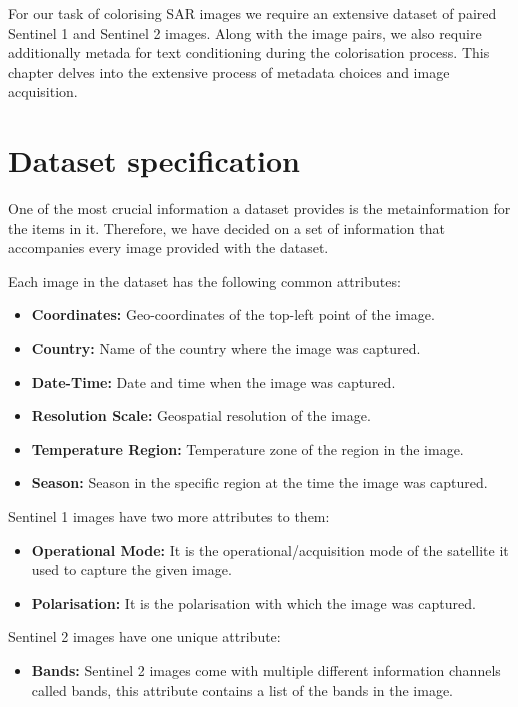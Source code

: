 For our task of colorising SAR images we require an extensive dataset of paired Sentinel 1 and Sentinel 2 images. Along with the image pairs, we also require additionally metada for text conditioning during the colorisation process. This chapter delves into the extensive process of metadata choices and image acquisition.

\section{Dataset specification}

One of the most crucial information a dataset provides is the metainformation for the items in it. Therefore, we have decided on a set of information that accompanies every image provided with the dataset.

Each image in the dataset has the following common attributes:
\begin{itemize}
    \item \textbf{Coordinates:} Geo-coordinates of the top-left point of the image.
    \item \textbf{Country:} Name of the country where the image was captured.
    \item \textbf{Date-Time:} Date and time when the image was captured.
    \item \textbf{Resolution Scale:} Geospatial resolution of the image.
    \item \textbf{Temperature Region:} Temperature zone of the region in the image.
    \item \textbf{Season:} Season in the specific region at the time the image was captured.
\end{itemize}

Sentinel 1 images have two more attributes to them:
\begin{itemize}
    \item \textbf{Operational Mode:} It is the operational/acquisition mode of the satellite it used to capture the given image.
    \item \textbf{Polarisation:} It is the polarisation with which the image was captured.
\end{itemize}

Sentinel 2 images have one unique attribute:
\begin{itemize}
    \item \textbf{Bands:} Sentinel 2 images come with multiple different information channels called bands, this attribute contains a list of the bands in the image.
\end{itemize}

